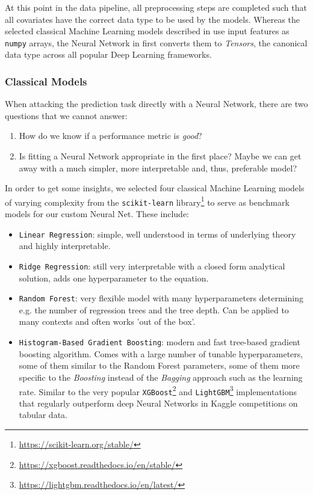 At this point in the data pipeline, all preprocessing steps are completed such that all covariates have the correct data type to be used by the models.
Whereas the selected classical Machine Learning models described in  use input features as \texttt{numpy} arrays, the Neural Network in  first converts them to \emph{Tensors}, the canonical data type across all popular Deep Learning frameworks.

\subsubsection{Classical Models} \label{classical-models}

When attacking the prediction task directly with a Neural Network, there are two questions that we cannot answer:
\begin{enumerate}
  \item How do we know if a performance metric is \emph{good}?
  \item Is fitting a Neural Network appropriate in the first place?
        Maybe we can get away with a much simpler, more interpretable and, thus, preferable model?
\end{enumerate}
In order to get some insights, we selected four classical Machine Learning models of varying complexity from the \texttt{scikit-learn} library\footnote{\url{https://scikit-learn.org/stable/}} \citep{pedregosa2011} to serve as benchmark models for our custom Neural Net.
These include:
\begin{itemize}
  \item \texttt{Linear Regression}: simple, well understood in terms of underlying theory and highly interpretable.
  \item \texttt{Ridge Regression}: still very interpretable with a closed form analytical solution, adds one hyperparameter to the equation.
  \item \texttt{Random Forest}: very flexible model with many hyperparameters determining e.g. the number of regression trees and the tree depth.
        Can be applied to many contexts and often works 'out of the box'.
  \item \texttt{Histogram-Based Gradient Boosting}: modern and fast tree-based gradient boosting algorithm.
        Comes with a large number of tunable hyperparameters, some of them similar to the Random Forest parameters, some of them more specific to the \emph{Boosting} instead of the \emph{Bagging} approach such as the learning rate.
        Similar to the very popular \texttt{XGBoost}\footnote{\url{https://xgboost.readthedocs.io/en/stable/}} \citep{chen2016} and \texttt{LightGBM}\footnote{\url{https://lightgbm.readthedocs.io/en/latest/}} \citep{ke2017} implementations that regularly outperform deep Neural Networks in Kaggle competitions on tabular data.
\end{itemize}

